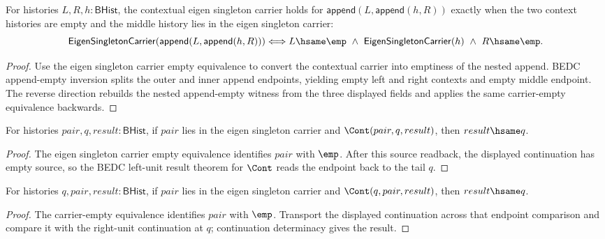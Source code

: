 \begin{theorem}
\label{thm:eigen-singleton-carrier-append-context-empty-iff}
For histories $L,R,h:\mathsf{BHist}$, the contextual eigen singleton carrier
holds for $\mathsf{append}(L,\mathsf{append}(h,R))$ exactly when the two
context histories are empty and the middle history lies in the eigen singleton
carrier:
$$
\mathsf{EigenSingletonCarrier}(\mathsf{append}(L,\mathsf{append}(h,R)))
\Longleftrightarrow
L\hsame\emp\ \wedge\ \mathsf{EigenSingletonCarrier}(h)\ \wedge\ R\hsame\emp.
$$
\end{theorem}
\begin{proof}
Use the eigen singleton carrier empty equivalence to convert the contextual
carrier into emptiness of the nested append. BEDC append-empty inversion splits
the outer and inner append endpoints, yielding empty left and right contexts and
empty middle endpoint. The reverse direction rebuilds the nested append-empty
witness from the three displayed fields and applies the same carrier-empty
equivalence backwards.
\end{proof}

\begin{theorem}
\label{thm:eigen-singleton-carrier-cont-left-unit-result}
For histories $pair,q,result:\mathsf{BHist}$, if $pair$ lies in the eigen
singleton carrier and $\Cont(pair,q,result)$, then $result\hsame q$.
\end{theorem}
\begin{proof}
The eigen singleton carrier empty equivalence identifies $pair$ with $\emp$.
After this source readback, the displayed continuation has empty source, so
the BEDC left-unit result theorem for $\Cont$ reads the endpoint back to the
tail $q$.
\end{proof}

\begin{theorem}
\label{thm:eigen-singleton-carrier-cont-right-unit-result}
For histories $q,pair,result:\mathsf{BHist}$, if $pair$ lies in the eigen
singleton carrier and $\Cont(q,pair,result)$, then $result\hsame q$.
\end{theorem}
\begin{proof}
The carrier-empty equivalence identifies $pair$ with $\emp$. Transport the
displayed continuation across that endpoint comparison and compare it with the
right-unit continuation at $q$; continuation determinacy gives the result.
\end{proof}

